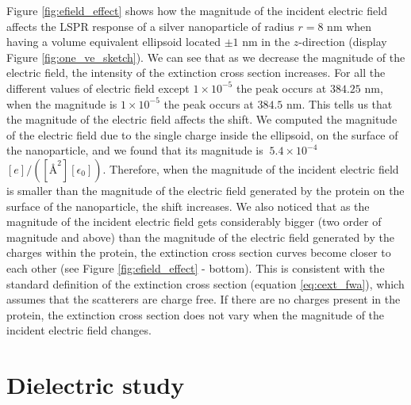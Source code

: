 Figure \ref{fig:efield_effect} shows how the magnitude of the incident electric field affects the LSPR response 
of a silver nanoparticle of radius $r=8$ nm when having a volume equivalent ellipsoid located 
$\pm 1$ nm in the $z$-direction (display Figure \ref{fig:one_ve_sketch}). We can see that as we decrease the magnitude of the electric field, 
the intensity of the extinction cross section increases. For all the different values of electric field except 
$1\times10^{-5}$ the peak occurs at $384.25$ nm, when the magnitude is $1\times10^{-5}$ the peak occurs at 
$384.5$ nm. This tells us that the magnitude of the electric field affects the shift. We computed 
the magnitude of the electric field due to the single charge inside the ellipsoid, on the surface of the nanoparticle,
and we found that its magnitude is $~5.4 \times 10^{-4}$ $[e]/([{\text{\AA}}^2][\epsilon_0])$. Therefore, 
when the magnitude of the incident electric field is smaller than the magnitude of the electric field generated by 
the protein on the surface of the nanoparticle, the shift increases. We also noticed that as the magnitude of the incident electric 
field gets considerably bigger (two order of magnitude and above) than the magnitude of the electric field generated by the charges within the 
protein, the extinction cross section curves become closer to each other (see Figure \ref{fig:efield_effect} - bottom). This is
consistent with the standard definition of the extinction cross section (equation \ref{eq:cext_fwa}), which assumes that the scatterers are charge free. If 
there are no charges present in the protein, the extinction cross section does not vary when the magnitude of the incident electric field changes. 


\section{Dielectric study}\label{sec:diel_study}

